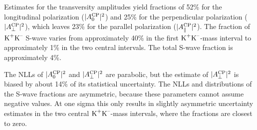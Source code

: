 Estimates for the transversity amplitudes yield fractions of 52\% for the longitudinal \BstoJpsiphi{} polarization ($|A_{\text{0}}^{\text{CP}}|^2$) and
25\% for the perpendicular polarization ($|A_{\perp}^{\text{CP}}|^2$), which leaves 23\% for the parallel polarization ($|A_{\parallel}^{\text{CP}}|^2$). The fraction of
$\text{K}^\text{+}\text{K}^\text{--}$ S-wave varies from approximately 40\% in the first $\text{K}^\text{+}\text{K}^\text{--}$-mass interval to approximately 1\% in the two central intervals. The total
S-wave fraction is approximately 4\%.

The NLLs of $|A_{\text{0}}^{\text{CP}}|^2$ and $|A_{\perp}^{\text{CP}}|^2$ are parabolic, but the estimate of $|A_{\perp}^{\text{CP}}|^2$ is biased by about 14\% of its statistical
uncertainty. The NLLs and distributions of the S-wave fractions are asymmetric, because these parameters cannot assume negative values. At
one sigma this only results in slightly asymmetric uncertainty estimates in the two central $\text{K}^\text{+}\text{K}^\text{--}$-mass intervals, where the
fractions are closest to zero.

